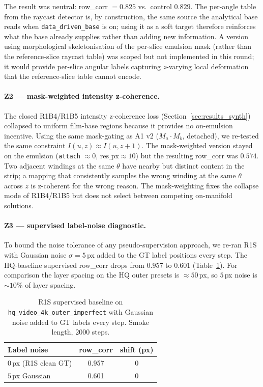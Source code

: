 \documentclass[11pt,a4paper]{article}
\begin{document}
The result was neutral: row\_corr $= 0.825$ vs.\ control $0.829$. The per-angle table from the raycast detector is, by construction, the same source the analytical base reads when \texttt{data\_driven\_base} is on; using it as a soft target therefore reinforces what the base already supplies rather than adding new information. A version using morphological skeletonisation of the per-slice emulsion mask (rather than the reference-slice raycast table) was scoped but not implemented in this round; it would provide per-slice angular labels capturing $z$-varying local deformation that the reference-slice table cannot encode.

\paragraph{Z2 — mask-weighted intensity z-coherence.} The closed R1B4/R1B5 intensity z-coherence loss (Section~\ref{sec:results_synth}) collapsed to uniform film-base regions because it provides no on-emulsion incentive. Using the same mask-gating as A1 v2 ($M_a \cdot M_b$, detached), we re-tested the same constraint $I(u, z) \approx I(u, z + 1)$. The mask-weighted version stayed on the emulsion (\texttt{attach} $\approx 0$, $\mathrm{res\_px} \approx 10$) but the resulting row\_corr was $0.574$. Two adjacent windings at the same $\theta$ have nearby but distinct content in the strip; a mapping that consistently samples the wrong winding at the same $\theta$ across $z$ is z-coherent for the wrong reason. The mask-weighting fixes the collapse mode of R1B4/R1B5 but does not select between competing on-manifold solutions.

\paragraph{Z3 — supervised label-noise diagnostic.} To bound the noise tolerance of any pseudo-supervision approach, we re-ran R1S with Gaussian noise $\sigma = 5$\,px added to the GT label positions every step. The HQ-baseline supervised row\_corr drops from $0.957$ to $0.601$ (Table~\ref{tab:phase3_z3}). For comparison the layer spacing on the HQ outer presets is $\approx 50$\,px, so $5$\,px noise is $\sim 10\%$ of layer spacing.

\begin{table}[H]
\centering
\small
\begin{tabular}{lcc}
\toprule
Label noise & row\_corr & shift (px) \\
\midrule
$0$\,px (R1S clean GT)  & 0.957 & 0 \\
$5$\,px Gaussian        & 0.601 & 0 \\
\bottomrule
\end{tabular}
\caption{R1S supervised baseline on \texttt{hq\_video\_4k\_outer\_imperfect} with Gaussian noise added to GT labels every step. Smoke length, 2000 steps.}
\label{tab:phase3_z3}
\end{table}
\end{document}
